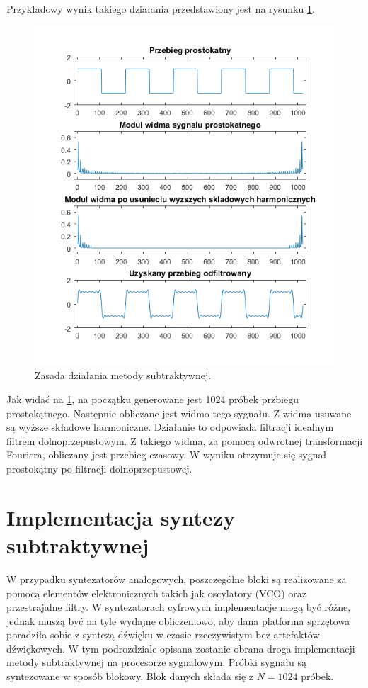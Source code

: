 Przykładowy wynik takiego działania przedstawiony jest na rysunku \ref{rys:sub_wykres1}.
\begin{figure}[H]
	\centering
	\includegraphics[width=12cm]{grafiki/sub_wykres1}
	\captionsetup{justification=centering}
	\caption{Zasada działania metody subtraktywnej.}
	\label{rys:sub_wykres1}
\end{figure}
Jak widać na \ref{rys:sub_wykres1}, na początku generowane jest 1024 próbek przbiegu prostokątnego. Następnie obliczane jest widmo tego sygnału. Z widma usuwane są wyższe składowe harmoniczne. Działanie to odpowiada filtracji idealnym filtrem dolnoprzepustowym. Z takiego widma, za pomocą odwrotnej transformacji Fouriera, obliczany jest przebieg czasowy. W wyniku otrzymuje się sygnał prostokątny po filtracji dolnoprzepustowej.
\section{Implementacja syntezy subtraktywnej}
W przypadku syntezatorów analogowych, poszczególne bloki są realizowane za pomocą elementów elektronicznych takich jak oscylatory (VCO) oraz przestrajalne filtry. W syntezatorach cyfrowych implementacje mogą być różne, jednak muszą być na tyle wydajne obliczeniowo, aby dana platforma sprzętowa poradziła sobie z syntezą dźwięku w czasie rzeczywistym bez artefaktów dźwiękowych. W tym podrozdziale opisana zostanie obrana droga implementacji metody subtraktywnej na procesorze sygnałowym. 
Próbki sygnału są syntezowane w sposób blokowy. Blok danych składa się z $N=1024$ próbek.

